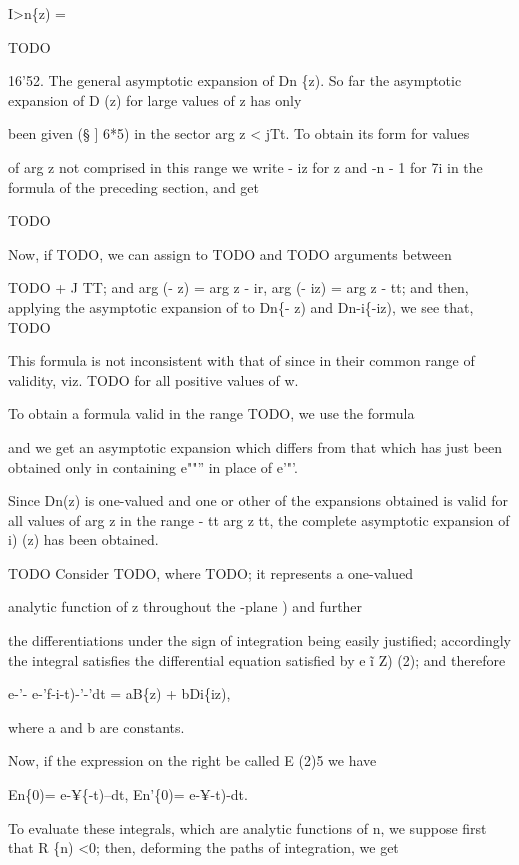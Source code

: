I>n\{z) =

TODO

16'52. The general asymptotic expansion of Dn \{z). So far the
asymptotic expansion of D (z) for large values of z has only

been given (§ ] 6*5) in the sector arg z < jTt. To obtain its form for
values

of arg z not comprised in this range we write - iz for z and -n - 1
for 7i in the formula of the preceding section, and get

TODO

Now, if TODO, we can assign to TODO and TODO arguments between

TODO + J TT; and arg (- z) = arg z - ir, arg (- iz) = arg z - tt;
and then, applying the asymptotic expansion of to Dn\{- z) and
Dn-i\{-iz), we see that, TODO

%
%

This formula is not inconsistent with that of since in their
common range of validity, viz. TODO for all positive values of w.

To obtain a formula valid in the range TODO, we use the formula

and we get an asymptotic expansion which differs from that which has
just been obtained only in containing e""'' in place of e'"'.

Since Dn(z) is one-valued and one or other of the expansions obtained
is valid for all values of arg z in the range - tt  arg z tt, the
complete asymptotic expansion of i) (z) has been obtained.


TODO Consider TODO, where TODO; it represents a one-valued

analytic function of z throughout the -plane ) and further

the differentiations under the sign of integration being easily
justified; accordingly the integral satisfies the differential
equation satisfied by e \~ i Z) (2); and therefore

e-'- e-'f-i-t)-'-'dt = aB\{z) + bDi\{iz),

where a and b are constants.

Now, if the expression on the right be called E (2)5 we have

En\{0)= e-¥\{-t)--dt, En'\{0)= e-¥-t)-dt.

To evaluate these integrals, which are analytic functions of n, we
suppose first that R \{n) <0; then, deforming the paths of
integration, we get

